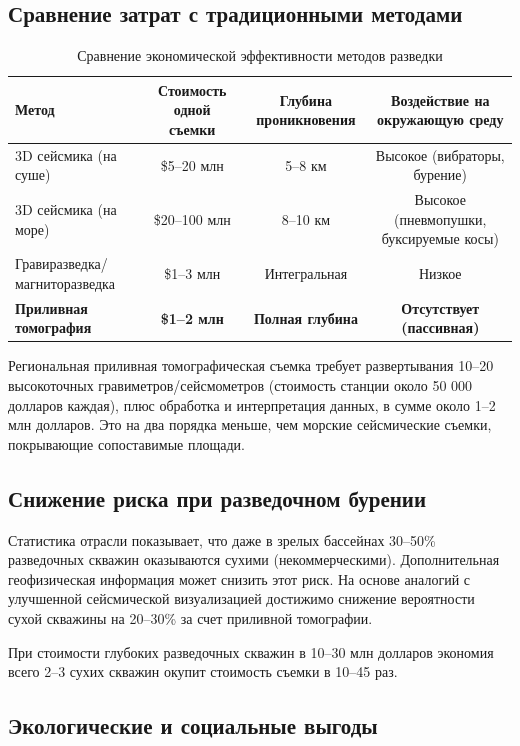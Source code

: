 \documentclass[12pt,a4paper]{article}
\theoremstyle{remark}
\begin{document}
	\subsection{Сравнение затрат с традиционными методами}
	
	\begin{table}[htbp]
		\centering
		\caption{Сравнение экономической эффективности методов разведки}
		\label{tab:economics}
		\small
		\begin{tabular}{lccc}
			\toprule
			\textbf{Метод} & \textbf{Стоимость одной съемки} & \textbf{Глубина проникновения} & \textbf{Воздействие на окружающую среду} \\
			\midrule
			3D сейсмика (на суше) & \$5–20 млн & 5–8 км & Высокое (вибраторы, бурение) \\
			3D сейсмика (на море) & \$20–100 млн & 8–10 км & Высокое (пневмопушки, буксируемые косы) \\
			Гравиразведка/магниторазведка & \$1–3 млн & Интегральная & Низкое \\
			\textbf{Приливная томография} & \textbf{\$1–2 млн} & \textbf{Полная глубина} & \textbf{Отсутствует (пассивная)} \\
			\bottomrule
		\end{tabular}
	\end{table}
	
	Региональная приливная томографическая съемка требует развертывания 10–20 высокоточных гравиметров/сейсмометров (стоимость станции около 50 000 долларов каждая), плюс обработка и интерпретация данных, в сумме около 1–2 млн долларов. Это на два порядка меньше, чем морские сейсмические съемки, покрывающие сопоставимые площади.
	
	\subsection{Снижение риска при разведочном бурении}
	
	Статистика отрасли показывает, что даже в зрелых бассейнах 30–50\% разведочных скважин оказываются сухими (некоммерческими). Дополнительная геофизическая информация может снизить этот риск. На основе аналогий с улучшенной сейсмической визуализацией достижимо снижение вероятности сухой скважины на 20–30\% за счет приливной томографии.
	
	При стоимости глубоких разведочных скважин в 10–30 млн долларов экономия всего 2–3 сухих скважин окупит стоимость съемки в 10–45 раз.
	
	\subsection{Экологические и социальные выгоды}
	
\end{document}
